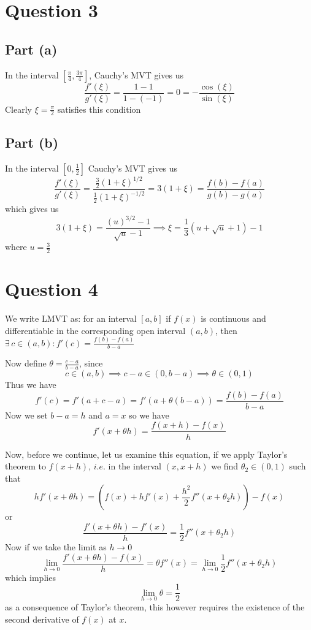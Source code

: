 \documentclass[12pt]{article}
\begin{document}
\section{Question 3}
\subsection{Part (a)}
In the interval $\left[ \frac{\pi}{4}, \frac{3\pi}{4} \right]$, Cauchy's MVT gives us
$$
\frac{f'(\xi)}{g'(\xi)} = \frac{1-1}{1-(-1)} = 0 = -\frac{\cos(\xi)}{\sin(\xi)}
$$
Clearly $\xi = \frac{\pi}{2}$ satisfies this condition

\subsection{Part (b)}
In the interval $\left[ 0,  \frac{1}{2} \right]$ Cauchy's MVT gives us
$$
\frac{f'(\xi)}{g'(\xi)} = \frac{\frac{3}{2}(1+\xi)^{1/2}}{\frac{1}{2}(1+\xi)^{-1/2}} = 3(1+\xi) = \frac{f(b)-f(a)}{g(b) -g(a)} 
$$
which gives us
$$
3(1+\xi) = \frac{\left( u \right)^{3/2}-1}{\sqrt{ u }-1} \implies \xi = \frac{1}{3} (u + \sqrt{ u } + 1)-1
$$
where $u = \frac{3}{2}$

\section{Question 4}
We write LMVT as: for an interval $[a,b]$ if $f(x)$ is continuous and differentiable in the corresponding open interval $(a,b)$, then $\exists \, c \in (a,b) : f'(c) = \frac{f(b)-f(a)}{b-a}$

Now define $\theta = \frac{c-a}{b-a}$, since 
$$
c \in(a,b) \implies c-a \in(0,b-a) \implies \theta \in(0,1)
$$
Thus we have
$$
\boxed{
f'(c) = f'(a + c-a) = f'(a + \theta(b-a)) = \frac{f(b)-f(a)}{b-a}
}
$$
Now we set $b-a = h$ and $a = x$ so we have
$$
f'(x + \theta h) = \frac{f(x + h)-f(x)}{h}
$$

Now, before we continue, let us examine this equation, if we apply Taylor's theorem to $f(x +h)$, $i$.$e$. in the interval $(x,x+h)$ we find $\theta_{2} \in (0,1)$ such that
$$
hf'(x + \theta h) = \left( f(x) + hf'(x) + \frac{h^{2}}{2}f''(x + \theta_{2}h) \right)-f(x)
$$
or
$$
\frac{f'(x + \theta h)-f'(x)}{h} =\frac{1}{2}f''(x +\theta_{2}h)
$$
Now if we take the limit as $h \to 0$
$$
\lim_{ h \to 0 } \frac{f'(x + \theta h)-f(x)}{h} = \theta f''(x) = \lim_{  h \to 0 } \frac{1}{2}f''(x + \theta_{2}h)
$$
which implies
$$
\lim_{ h \to 0 } \theta = \frac{1}{2}
$$
as a consequence of Taylor's theorem, this however requires the existence of the second derivative of $f(x)$ at $x$.
\end{document}
